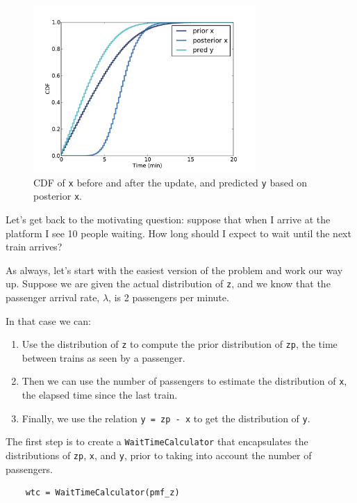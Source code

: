 \documentclass[12pt]{book}
\begin{document}
\begin{figure}
\centerline{\includegraphics[height=2.5in]{figs/redline3.pdf}}
\caption{CDF of {\tt x} before and after the update, and predicted
{\tt y} based on posterior {\tt x}. }
\label{fig.redline3}
\end{figure}

Let's get back to the motivating question: suppose that when
I arrive at the platform I see 10 people waiting.
How long should I expect to wait until the next train arrives?

As always, let's start with the easiest version of the problem
and work our way up.  Suppose we are given the actual distribution of
{\tt z}, and we know that the passenger arrival rate,
$\lambda$, is 2 passengers per minute.

In that case we can:

\begin{enumerate}

\item Use the distribution of {\tt z} to compute
the prior distribution of {\tt zp}, the time between trains
as seen by a passenger.

\item Then we can use the number of passengers to estimate the distribution
of {\tt x}, the elapsed time since the last train.

\item Finally, we use the relation {\tt y = zp - x} to get the
distribution of {\tt y}.

\end{enumerate}

The first step is to create a {\tt WaitTimeCalculator} that
encapsulates the distributions of {\tt zp}, {\tt x},
and {\tt y}, prior to taking into account the number of
passengers.

\begin{verbatim}
    wtc = WaitTimeCalculator(pmf_z)
\end{verbatim}
\end{document}

